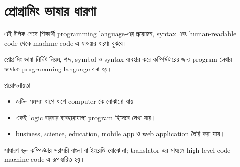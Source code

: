 \section{প্রোগ্রামিং ভাষার ধারণা}

\begin{learningbox}
এই টপিক শেষে শিক্ষার্থী programming language-এর প্রয়োজন, syntax এবং human-readable code থেকে machine code-এ যাওয়ার ধারণা বুঝবে।
\end{learningbox}

\begin{definitionbox}{প্রোগ্রামিং ভাষা}
নির্দিষ্ট নিয়ম, শব্দ, symbol ও syntax ব্যবহার করে কম্পিউটারের জন্য program লেখার ভাষাকে programming language বলা হয়।
\end{definitionbox}

\begin{center}
\end{center}

\begin{keypointbox}{প্রয়োজনীয়তা}
\begin{itemize}
\item জটিল সমস্যা ধাপে ধাপে computer-কে বোঝানো যায়।
\item একই logic বারবার ব্যবহারযোগ্য program হিসেবে লেখা যায়।
\item business, science, education, mobile app ও web application তৈরি করা যায়।
\end{itemize}
\end{keypointbox}

\begin{mistakebox}{সাধারণ ভুল}
কম্পিউটার সরাসরি বাংলা বা ইংরেজি বোঝে না; translator-এর মাধ্যমে high-level code machine code-এ রূপান্তরিত হয়।
\end{mistakebox}
